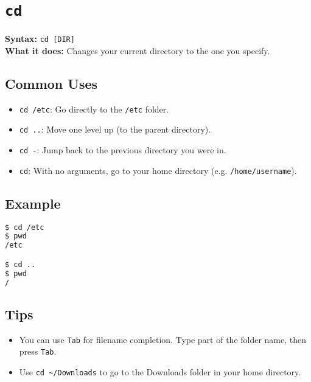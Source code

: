 \documentclass[10pt,oneside]{scrbook}
\begin{document}
\section{\texttt{cd}}
\begin{cmdbox}
  \textbf{Syntax:} \lstinline!cd [DIR]! \\
  \textbf{What it does:} Changes your current directory to the one you specify.
\end{cmdbox}
\begin{commanddetails}
  \subsection*{Common Uses}
  \begin{itemize}
    \item \lstinline!cd /etc!: Go directly to the \texttt{/etc} folder.
    \item \lstinline!cd ..!: Move one level up (to the parent directory).
    \item \lstinline!cd -!: Jump back to the previous directory you were in.
    \item \lstinline!cd!: With no arguments, go to your home directory (e.g. \texttt{/home/username}).
  \end{itemize}

  \subsection*{Example}
  \begin{lstlisting}[language=bash]
$ cd /etc
$ pwd
/etc

$ cd ..
$ pwd
/
  \end{lstlisting}

  \subsection*{Tips}
  \begin{itemize}
    \item You can use \texttt{Tab} for filename completion. Type part of the folder name, then press \texttt{Tab}.
    \item Use \lstinline!cd ~/Downloads! to go to the Downloads folder in your home directory.
  \end{itemize}
\end{commanddetails}
\end{document}
